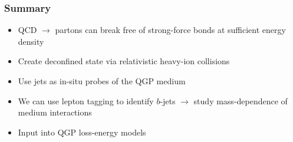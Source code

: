 \begin{frame}

  \frametitle{\textbf{Summary}}

  \begin{itemize}
  \item QCD $\to$ partons can break free of strong-force bonds at sufficient energy density
  \item Create deconfined state via relativistic heavy-ion collisions
  \item Use jets as in-situ probes of the QGP medium
  \item We can use lepton tagging to identify $b$-jets $\to$ study mass-dependence of medium interactions
  \item Input into QGP loss-energy models 
  \end{itemize}


\end{frame}
